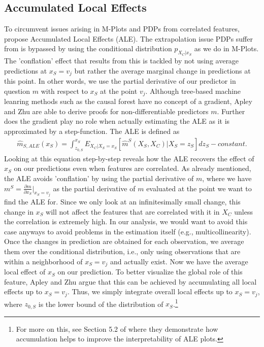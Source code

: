 \subsection{Accumulated Local Effects}
To circumvent issues arising in M-Plots and PDPs from correlated features, \citep{apleyzhu_2020} propose Accumulated Local Effects (ALE). The extrapolation issue PDPs suffer from is bypassed by using the conditional distribution $p_{X_C|x_S}$ as we do in M-Plots. The 'conflation' effect that results from this is tackled by not using average predictions at $x_S=v_j$ but rather the average marginal change in predictions at this point. In other words, we use the partial derivative of our predictor in question $m$ with respect to $x_S$ at the point $v_j$. Although tree-based machine leanring methods such as the causal forest have no concept of a gradient, Apley and Zhu are able to derive proofs for non-differentiable predictors $m$. Further does the gradient play no role when actually estimating the ALE as it is approximated by a step-function. The ALE is defined as
\begin{align}
\hat{m}_{S, ALE} (x_S)=\int_{z_{0, S}}^{x_S} E_{X_C|X_S=x_S}[\hat{m}^S(X_S, X_C)|X_S=z_S]dz_S - constant. \label{eq:ale}
\end{align}
Looking at this equation step-by-step reveals how the ALE recovers the effect of $x_S$ on our predictions even when features are correlated. As already mentioned, the ALE avoids 'conflation' by using the partial derivative of $m$, where we have $m^S=\frac{\partial m}{\partial x_S}\rvert_{x_S=v_j}$ as the partial derivative of $m$ evaluated at the point we want to find the ALE for. Since we only look at an infinitesimally small change, this change in $x_S$ will not affect the features that are correlated with it in $X_C$ unless the correlation is extremely high. In our analysis, we would want to avoid this case anyways to avoid problems in the estimation itself (e.g., multicollinearity). Once the changes in prediction are obtained for each observation, we average them over the conditional distribution, i.e., only using observations that are within a neighborhood of $x_S=v_j$ and actually exist. Now we have the average local effect of $x_S$ on our prediction. To better visualize the global role of this feature, Apley and Zhu argue that this can be achieved by accumulating all local effects up to $x_S=v_j$. Thus, we simply integrate overall local effects up to $x_S=v_j$, where $z_{0, S}$ is the lower bound of the distribution of $x_S$.\footnote{For more on this, see Section 5.2 of \citep{apleyzhu_2020} where they demonstrate how accumulation helps to improve the interpretability of ALE plots.} \\
